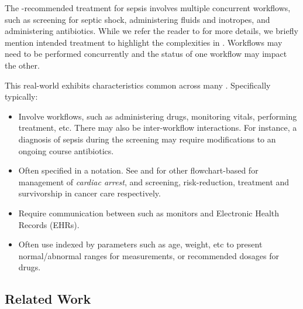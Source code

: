 The \BPG{}-recommended treatment for
sepsis involves multiple concurrent workflows, such as
screening for septic shock, administering fluids and inotropes, and administering antibiotics.
While we refer the reader to \cite{SaxenaFMCAD23} for more details,
we briefly mention intended treatment to highlight the complexities in
\BPGs{}. Workflows may need to be performed concurrently and
the status of one workflow may impact the other.


This real-world \BPG{} exhibits characteristics common
across many \BPGs{}. Specifically \BPGs{} typically:
\begin{itemize}
  \item Involve  workflows, such as administering drugs,
    monitoring vitals, performing treatment, etc. There may also be
    inter-workflow interactions. For instance, a diagnosis of sepsis during the
    screening may require modifications to an ongoing course antibiotics.
  \item Often specified in a 
    notation. See \cite{AHAFlowcharts} and \cite{CancerCareFlowcharts} for other flowchart-based \BPGs{} for management of \emph{cardiac arrest}, and
    screening, risk-reduction, treatment and survivorship in
    cancer care respectively.
  \item Require communication between  such as
     monitors and Electronic Health Records (EHRs).
  \item Often use  indexed by parameters such as age, weight,
    etc to present normal/abnormal ranges for measurements, or recommended dosages for drugs.
\end{itemize}


\subsection{Related Work}\label{subsec:related-work}

